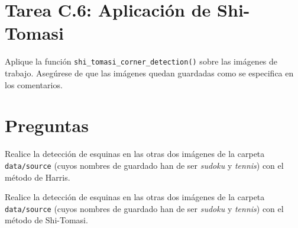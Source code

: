 \section*{Tarea C.6: Aplicación de Shi-Tomasi}
Aplique la función \texttt{shi\_tomasi\_corner\_detection()} sobre las imágenes de trabajo. Asegúrese de que las imágenes quedan guardadas como se especifica en los comentarios.

\section*{Preguntas}

\vspace{5mm}
\begin{tcolorbox}[colback=gray!10, colframe=gray!30, coltitle=black, title=Pregunta C.1, halign=left]
Realice la detección de esquinas en las otras dos imágenes de la carpeta \texttt{data/source} (cuyos nombres de guardado han de ser \textit{sudoku} y \textit{tennis}) con el método de Harris.
\end{tcolorbox}

\vspace{5mm}
\begin{tcolorbox}[colback=gray!10, colframe=gray!30, coltitle=black, title=Pregunta C.2, halign=left]
Realice la detección de esquinas en las otras dos imágenes de la carpeta \texttt{data/source} (cuyos nombres de guardado han de ser \textit{sudoku} y \textit{tennis}) con el método de Shi-Tomasi.
\end{tcolorbox}